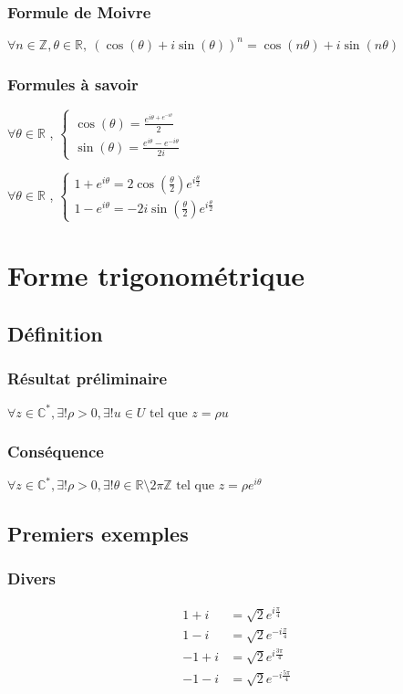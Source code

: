 \documentclass[12pt,a4paper,french]{book}
\begin{document}
			\subsubsection{Formule de Moivre}
			$\forall n \in \mathbb{Z}, \theta \in \mathbb{R},\ (\cos(\theta)+i\sin(\theta))^n = \cos(n\theta)+i\sin(n\theta)$
			\subsubsection{Formules à savoir}
				$\forall \theta \in \mathbb{R}$ , $\left\{ \begin{array}{ll}
				\cos(\theta) = \frac{e^{i\theta + e^{-i\theta}}}{2} \\
				\sin(\theta) = \frac{e^{i\theta}- e^{-i \theta}}{2i}
			\end{array} \right. $
			
			$\forall \theta \in \mathbb{R}$ , $\left\{ \begin{array}{ll}
				1+e^{i \theta} = 2\cos\left(\frac{\theta}{2}\right) e^{i \frac{\theta}{2} } \\
				1-e^{i \theta} = -2i\sin\left(\frac{\theta}{2}\right) e^{i \frac{\theta}{2} }
			\end{array} \right. $
	\section{Forme trigonométrique}
		\subsection{Définition}
			\subsubsection{Résultat préliminaire}
			$\forall z \in \mathbb{C}^\ast, \exists! \rho > 0, \exists! u \in U \mbox{ tel que } z = \rho u$
			\subsubsection{Conséquence}
			$\forall z \in \mathbb{C}^\ast, \exists! \rho >0, \exists! \theta \in \mathbb{R} \setminus 2\pi \mathbb{Z} \mbox{ tel que } z = \rho e^{i\theta}$
		\subsection{Premiers exemples}
			\subsubsection{Divers}
			\begin{equation*}
				\begin{split}
					1+i &= \sqrt{2}e^{i\frac{\pi}{4}} \\
					1-i &= \sqrt{2}e^{-i\frac{\pi}{4}} \\
					-1+i &= \sqrt{2}e^{i\frac{3\pi}{4}} \\
					-1-i &= \sqrt{2}e^{-i\frac{5\pi}{4}} \\
				\end{split}
			\end{equation*}
\end{document}
